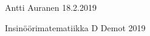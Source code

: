 \documentclass[a4paper,12pt]{article}
\begin{document}
\noindent Antti Auranen
\hfill 18.2.2019
\vspace{20mm}
\begin{center}
\huge{Insinöörimatematiikka D Demot 2019}
\end{center}



\end{document}
